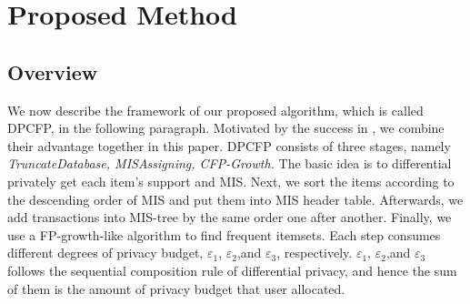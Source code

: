 \documentclass[conference]{IEEEtran}
\begin{document}
\section{Proposed Method}
\subsection{Overview}
We now describe the framework of our proposed algorithm, which is called DPCFP, in the following paragraph. 
Motivated by the success in \cite{b4}\cite{b6}\cite{b8}, we combine their advantage together in this paper. 
DPCFP consists of three stages, namely {\it{TruncateDatabase}, \it{MISAssigning}, \it{CFP-Growth}.} 
The basic idea is to differential privately get each item's support and MIS. 
Next, we sort the items according to the descending order of MIS and put them into MIS header table. 
Afterwards, we add transactions into MIS-tree by the same order one after another. 
Finally, we use a FP-growth-like algorithm to find frequent itemsets.
Each step consumes different degrees of privacy budget, $\varepsilon_1$, $\varepsilon_2$,and $\varepsilon_3$, respectively.
$\varepsilon_1$, $\varepsilon_2$,and $\varepsilon_3$ follows the sequential composition rule of differential privacy, and hence the sum of them is the amount of privacy budget that user allocated.
\end{document}
